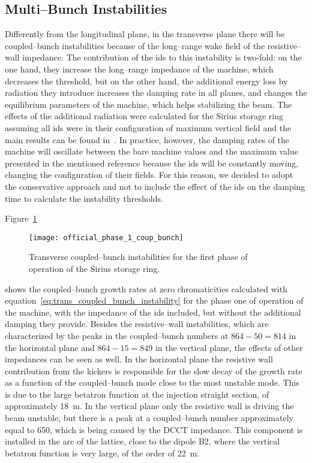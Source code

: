 \subsection{Multi--Bunch Instabilities}

    Differently from the longitudinal plane, in the transverse plane there will be coupled--bunch instabilities because of the long--range wake field of the resistive--wall impedance. The contribution of the \glspl{id} to this instability is two-fold: on the one hand, they increase the long--range impedance of the machine, which decreases the threshold, but on the other hand, the additional energy loss by radiation they introduce increases the damping rate in all planes, and changes the equilibrium parameters of the machine, which helps stabilizing the beam. The effects of the additional radiation were calculated for the Sirius storage ring assuming all \glspl{id} were in their configuration of maximum vertical field and the main results can be found in~\cite{Sirius2013}. In practice, however, the damping rates of the machine will oscillate between the bare machine values and the maximum value presented in the mentioned reference because the \glspl{id} will be constantly moving, changing the configuration of their fields. For this reason, we decided to adopt the conservative approach and not to include the effect of the \glspl{id} on the damping time to calculate the instability thresholds.

    Figure~\ref{fig:ph1_coup_bunch}
    \begin{figure}
        \centering
        \texttt{[image: official\_phase\_1\_coup\_bunch]}
        \caption{Transverse coupled--bunch instabilities for the first phase of operation of the Sirius storage ring.}
        \label{fig:ph1_coup_bunch}
    \end{figure}
    shows the coupled--bunch growth rates at zero chromaticities calculated with equation~\ref{eq:trans_coupled_bunch_instability} for the phase one of operation of the machine, with the impedance of the \glspl{id} included, but without the additional damping they provide. Besides the resistive--wall instabilities, which are characterized by the peaks in the coupled--bunch numbers at $864-50=814$ in the horizontal plane and $864-15=849$ in the vertical plane, the effects of other impedances can be seen as well. In the horizontal plane the resistive wall contribution from the kickers is responsible for the slow decay of the growth rate as a function of the coupled--bunch mode close to the most unstable mode. This is due to the large betatron function at the injection straight section, of approximately \SI{18}{\meter}. In the vertical plane only the resistive wall is driving the beam unstable, but there is a peak at a coupled--bunch number approximately equal to 650, which is being caused by the DCCT impedance. This component is installed in the arc of the lattice, close to the dipole B2, where the vertical betatron function is very large, of the order of \SI{22}{\meter}.


